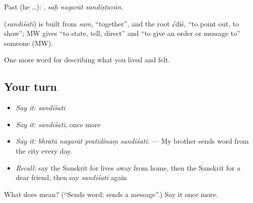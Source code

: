 Past (he …):   , \emph{saḥ nagarāt sandiṣṭavān}.

\begin{cousinweb}
\textbf{} (\emph{sandiśati}) is built from \emph{sam}, \textquotedblleft{}together\textquotedblright{}, and the root √diś, \textquotedblleft{}to point out, to show\textquotedblright{}; MW gives \textquotedblleft{}to state, tell, direct\textquotedblright{} and \textquotedblleft{}to give an order or message to\textquotedblright{} someone (MW).
\end{cousinweb}

\begin{grammarlens}[title={What you've built}]
One more word for describing what you lived and felt.
\end{grammarlens}

\subsection*{Your turn}
\begin{itemize}
\raggedright
  \item \emph{Say it:} \emph{sandiśati}
  \item \emph{Say it:} \emph{sandiśati}, once more
  \item \emph{Say it:} \emph{bhrātā nagarāt pratidinaṃ sandiśati.} — My brother sends word from the city every day.
  \item \emph{Recall:} say the Sanskrit for lives away from home, then the Sanskrit for a dear friend, then say \emph{sandiśati} again
\end{itemize}

\begin{tcolorbox}[breakable,colback=teal!4,colframe=teal!35!black,title={Before you move on}]
What does  mean? (\textquotedblleft{}Sends word; sends a message\textquotedblright{}.) Say it once more.
\end{tcolorbox}
